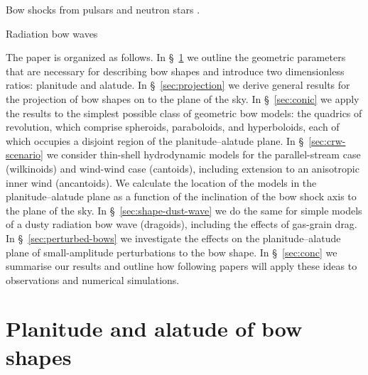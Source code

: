 Bow shocks from pulsars and neutron stars
\citep{Cordes:1993a, Brownsberger:2014a}.

Radiation bow waves \citep{van-Marle:2011a}

The paper is organized as follows.
%
In \S~\ref{sec:plan-alat-bow} we outline the geometric parameters that
are necessary for describing bow shapes and introduce two
dimensionless ratios: planitude and alatude.
%
In \S~\ref{sec:projection} we derive general results for the
projection of bow shapes on to the plane of the sky.
%
In \S~\ref{sec:conic} we apply the results to the simplest possible
class of geometric bow models: the quadrics of revolution, which
comprise spheroids, paraboloids, and hyperboloids, each of which
occupies a disjoint region of the planitude--alatude plane.
%
In \S~\ref{sec:crw-scenario} we consider thin-shell hydrodynamic
models for the parallel-stream case (wilkinoids) and wind-wind case
(cantoids), including extension to an anisotropic inner wind
(ancantoids).  We calculate the location of the models in the
planitude--alatude plane as a function of the inclination of the bow
shock axis to the plane of the sky.
%
In \S~\ref{sec:shape-dust-wave} we do the same for simple models of a
dusty radiation bow wave (dragoids), including the effects of
gas-grain drag.
%
In \S~\ref{sec:perturbed-bows} we investigate the effects on the
planitude--alatude plane of small-amplitude perturbations to the bow
shape.
%
In \S~\ref{sec:conc} we summarise our results and outline how
following papers will apply these ideas to observations and numerical
simulations.



\section{Planitude and alatude of bow shapes}
\label{sec:plan-alat-bow}

